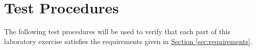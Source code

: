 \section{Test Procedures} \label{sec:testprocecedures}

The following test procedures will be used to verify that each part of this laboratory exercise satisfies the requirements given in \hyperref[sec:requirements]{Section \ref*{sec:requirements}}.